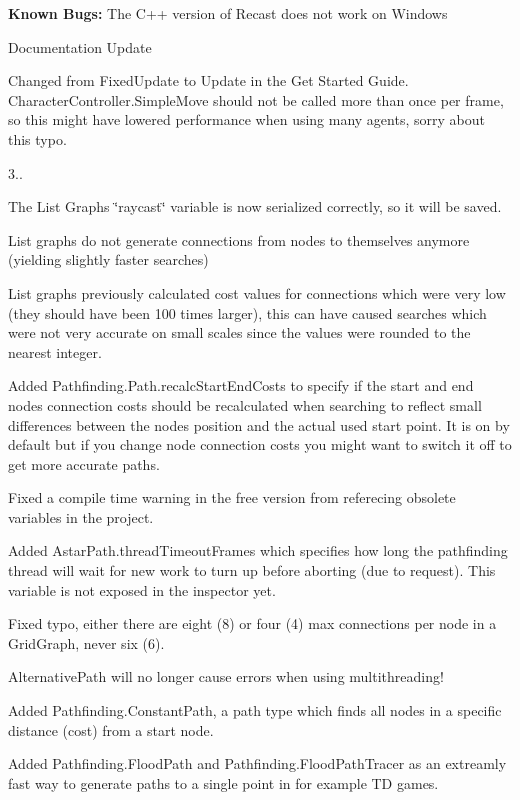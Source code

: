 \begin{DoxyItemize}
\begin{DoxyItemize}
{\bfseries{Known Bugs\+:}} The C++ version of Recast does not work on Windows
\end{DoxyItemize}
\item Documentation Update
\begin{DoxyItemize}
\item Changed from Fixed\+Update to Update in the Get Started Guide. Character\+Controller.\+Simple\+Move should not be called more than once per frame, so this might have lowered performance when using many agents, sorry about this typo.
\end{DoxyItemize}
\item 3..
\begin{DoxyItemize}
\item The List Graph\textquotesingle{}s \char`\"{}raycast\char`\"{} variable is now serialized correctly, so it will be saved.
\item List graphs do not generate connections from nodes to themselves anymore (yielding slightly faster searches)
\item List graphs previously calculated cost values for connections which were very low (they should have been 100 times larger), this can have caused searches which were not very accurate on small scales since the values were rounded to the nearest integer.
\item Added Pathfinding.\+Path.\+recalc\+Start\+End\+Costs to specify if the start and end nodes connection costs should be recalculated when searching to reflect small differences between the node\textquotesingle{}s position and the actual used start point. It is on by default but if you change node connection costs you might want to switch it off to get more accurate paths.
\item Fixed a compile time warning in the free version from referecing obsolete variables in the project.
\item Added Astar\+Path.\+thread\+Timeout\+Frames which specifies how long the pathfinding thread will wait for new work to turn up before aborting (due to request). This variable is not exposed in the inspector yet.
\item Fixed typo, either there are eight (8) or four (4) max connections per node in a Grid\+Graph, never six (6).
\item Alternative\+Path will no longer cause errors when using multithreading!
\item Added Pathfinding.\+Constant\+Path, a path type which finds all nodes in a specific distance (cost) from a start node.
\item Added Pathfinding.\+Flood\+Path and Pathfinding.\+Flood\+Path\+Tracer as an extreamly fast way to generate paths to a single point in for example TD games.

\end{DoxyItemize}
\end{DoxyItemize}
